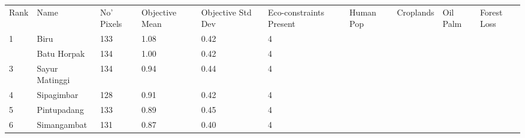 \begin{table}[ht]
\centering
\begingroup\fontsize{9pt}{10pt}\selectfont
\begin{tabular}{C{0.05\textwidth}C{0.15\textwidth}C{0.08\textwidth}C{0.08\textwidth}C{0.08\textwidth}C{0.08\textwidth}C{0.08\textwidth}C{0.08\textwidth}C{0.08\textwidth}C{0.08\textwidth}}
 Rank & Name & No' Pixels & Objective Mean & Objective Std Dev & Eco-constraints  Present & Human Pop & Croplands & Oil Palm & Forest Loss \\ 
 {1} & Biru & 133 & \textcolor[HTML]{FFFFFF}{1.08} & \textcolor[HTML]{000000}{0.42} & \textcolor[HTML]{FFFFFF}{4} &  &  &  &  \\ 
   & Batu Horpak & 134 & \textcolor[HTML]{FFFFFF}{1.00} & \textcolor[HTML]{000000}{0.42} & \textcolor[HTML]{FFFFFF}{4} &  &  &  &  \\ 
  {3} & Sayur Matinggi & 134 & \textcolor[HTML]{000000}{0.94} & \textcolor[HTML]{FFFFFF}{0.44} & \textcolor[HTML]{FFFFFF}{4} &  &  &  &  \\ 
  {4} & Sipagimbar & 128 & \textcolor[HTML]{000000}{0.91} & \textcolor[HTML]{000000}{0.42} & \textcolor[HTML]{FFFFFF}{4} &  &  &  &  \\ 
  {5} & Pintupadang & 133 & \textcolor[HTML]{000000}{0.89} & \textcolor[HTML]{FFFFFF}{0.45} & \textcolor[HTML]{FFFFFF}{4} &  &  &  &  \\ 
  {6} & Simangambat & 131 & \textcolor[HTML]{000000}{0.87} & \textcolor[HTML]{000000}{0.40} & \textcolor[HTML]{FFFFFF}{4} &  &  &  &  \\ 

\end{tabular}
\end{table}
